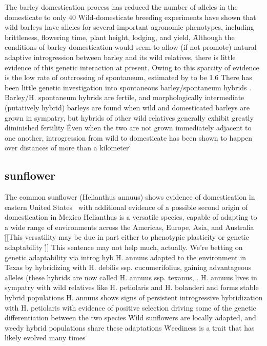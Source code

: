 \documentclass[11pt]{article}
\begin{document}
The barley domestication process has reduced the number of alleles in the domesticate to only 40%
Wild-domesticate breeding experiments have shown that wild barleys have alleles for several important agronomic phenotypes, including brittleness, flowering time, plant height, lodging, and yield,  \cite{von2006ab, handley1994chromosome}\.
Although the conditions of barley domestication would seem to allow (if not promote) natural adaptive introgression between barley and its wild relatives, there is little evidence of this genetic interaction at present.
Owing to this sparcity of evidence is the low rate of outcrossing of spontaneum, estimated by \cite{brown1978outcrossing} to be 1.6%
There has been little genetic investigation into spontaneous barley/spontaneum hybrids \cite{ellstrand2003dangerous}.
Barley/H. spontaneum hybrids are fertile, and morphologically intermediate (putatively hybrid) barleys are found when wild and domesticated barleys are grown in sympatry, but hybrids of other wild relatives generally exhibit greatly diminished fertility \cite{ellstrand2003dangerous, harlan1995living}\.
Even when the two are not grown immediately adjacent to one another, introgression from wild to domesticate has been shown to happen over distances of more than a kilometer \cite{hillman2001new}\.

\subsection*{sunflower}

The common sunflower (Helianthus annuus) shows evidence of domestication in eastern United States \cite{harter2004origin, wills2006chloroplast}\, with additional evidence of a possible second origin of domestication in Mexico \cite{lentz2008sunflower}\.
Helianthus is a versatile species, capable of adapting to a wide range of environments across the Americas, Europe, Asia, and Australia \cite{kane2008genetics}\.
[[This versatility may be due in part either to phenotypic plasticity or genetic adaptability \cite{maron2004rapid}\.]] This sentence may not help much, actually.  We're betting on genetic adaptability via introg hyb
H. annuus adapted to the environment in Texas by hybridizing with H. debilis ssp. cucumerifolius, gaining advantageous alleles (these hybrids are now called H. annuus ssp. texanus, \cite{kim1999genetic, heiser1951hybridization, rieseberg1999hybrid, rieseberg1990helianthus}.
H. annuus lives in sympatry with wild relatives like H. petiolaris and H. bolanderi and forms  stable hybrid populations \cite{schwarzbach2002likely, rieseberg1988molecular, welch2002patterns}\.
H. annuus shows signs of persistent introgressive hybridization with H. petiolaris with evidence of positive selection driving some of the genetic differentiation between the two species \cite{yatabe2007rampant}\.
Wild sunflowers are locally adapted, and weedy hybrid populations share these adaptations \cite{kane2008genetics}\.
Weediness is a trait that has likely evolved many times \cite{kane2008genetics}\.
\end{document}
